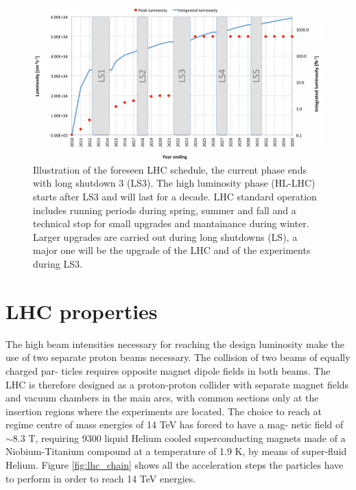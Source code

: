 \begin{figure}[!h]
  \includegraphics[width = 1.\textwidth]{figures/cms/Projected_LHC_Performance.png}
  \caption{Illustration of the foreseen LHC schedule, the current phase ends with long shutdown 3 (LS3). The high
    luminosity phase (HL-LHC) starts after LS3 and will last for a decade. LHC standard operation includes running
    periods during spring, summer and fall and a technical stop for small upgrades and mantainance during winter.
    Larger upgrades are carried out during long shutdowns (LS), a major one will be the upgrade of the LHC and of
  the experiments during LS3.}
  \label{fig:lhc_plan}  
\end{figure}

\section{LHC properties}
The high beam intensities necessary for reaching the design luminosity make the
use of two separate proton beams necessary. The collision of two beams of equally charged par-
ticles requires opposite magnet dipole fields in both beams. The LHC is therefore designed as a
proton-proton collider with separate magnet fields and vacuum chambers in the main arcs, with 
common sections only at the insertion regions where the experiments are located.
The choice to reach at regime centre of mass energies of 14 TeV has forced to have a mag-
netic field of $\sim 8.3$ T, requiring 9300 liquid Helium cooled superconducting magnets made of a
Niobium-Titanium compound at a temperature of 1.9 K, by means of super-fluid Helium. Figure \ref{fig:lhc_chain}
shows all the acceleration steps the particles have to perform in order to reach 14 TeV
energies. 

